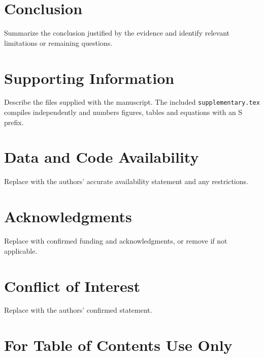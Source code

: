 \documentclass[letterpaper,11pt]{article}
\begin{document}
\section{Conclusion}\label{sec:conclusion}
Summarize the conclusion justified by the evidence and identify relevant
limitations or remaining questions.

\section*{Supporting Information}
Describe the files supplied with the manuscript. The included
\texttt{supplementary.tex} compiles independently and numbers figures, tables
and equations with an S prefix.

\section*{Data and Code Availability}
Replace with the authors' accurate availability statement and any restrictions.
\section*{Acknowledgments}
Replace with confirmed funding and acknowledgments, or remove if not applicable.
\section*{Conflict of Interest}
Replace with the authors' confirmed statement.



\clearpage
\section*{For Table of Contents Use Only}
\begin{center}
\end{center}
\end{document}
